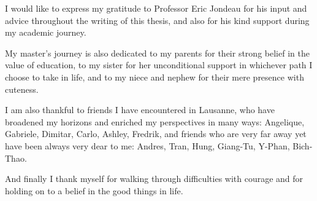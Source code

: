 \documentclass[
11pt, %
oneside, %
english, %
singlespacing, %
headsepline, %
]{MastersDoctoralThesis} %
\begin{document}

\begin{acknowledgements}
\addchaptertocentry{\acknowledgementname} %
I would like to express my gratitude to Professor Eric Jondeau for his input and advice throughout the writing of this thesis, and also for his kind support during my  academic journey. 

My master's journey is also dedicated to my parents for their strong belief in the value of education, to my sister for her unconditional support in whichever path I choose to take in life, and to my niece and nephew for their mere presence with cuteness.

I am also thankful to friends I have encountered in Lausanne, who have broadened my horizons and enriched my perspectives in many ways: Angelique, Gabriele, Dimitar, Carlo, Ashley, Fredrik, and friends who are very far away yet have been always very dear to me: Andres, Tran, Hung, Giang-Tu, Y-Phan, Bich-Thao.

And finally I thank myself for walking through difficulties with courage and for  holding on to a belief in the good things in life.
\end{acknowledgements}


\tableofcontents %

\begingroup
\makeatletter
\let\oldaddvspace\addvspace
\renewcommand*\addvspace[1]{}
\listoftables
\listoffigures
\let\addvspace\oldaddvspace
\makeatother
\endgroup
\end{document}

